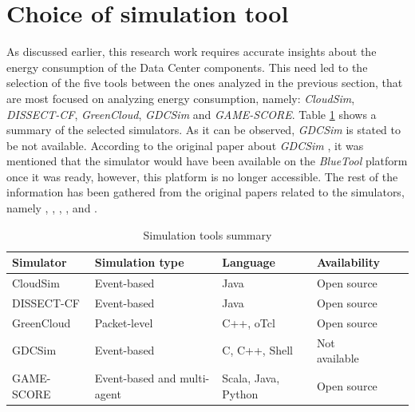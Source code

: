{\section{Choice of simulation tool}
As discussed earlier, this research work requires accurate insights about the energy consumption of the Data Center components. This need led to the selection of the five tools between the ones analyzed in the previous section, that are most focused on analyzing energy consumption, namely: \emph{CloudSim}, \emph{DISSECT-CF}, \emph{GreenCloud}, \emph{GDCSim} and \emph{GAME-SCORE}.
Table \ref{tab:comparison} shows a summary of the selected simulators. As it can be observed, \emph{GDCSim} is stated to be not available. According to the original paper about \emph{GDCSim} \cite{gupta2011gdcsim}, it was mentioned that the simulator would have been available on the \emph{BlueTool} platform once it was ready, however, this platform is no longer accessible. The rest of the information has been gathered from the original papers related to the simulators, namely \cite{son2015cloudsimsdn}, \cite{kecskemeti2015dissect}, \cite{kliazovich2012greencloud}, \cite{gupta2011gdcsim}, \cite{gdcsim_latest} and \cite{fernandez2019game}.
\begin{table}
    \caption{Simulation tools summary}\label{tab:comparison}
    \begin{tabular}{|l|l|l|l|l|l|}
      \hline
      Simulator  & Simulation type             & Language            & Availability  \\
      \hline
      CloudSim   & Event-based                 & Java                & Open source   \\
      DISSECT-CF & Event-based                 & Java                & Open source   \\
      GreenCloud & Packet-level                & C++, oTcl           & Open source   \\
      GDCSim     & Event-based                 & C, C++, Shell       & Not available \\
      GAME-SCORE & Event-based and multi-agent & Scala, Java, Python & Open source   \\
      \hline
    \end{tabular}
\end{table}

}
